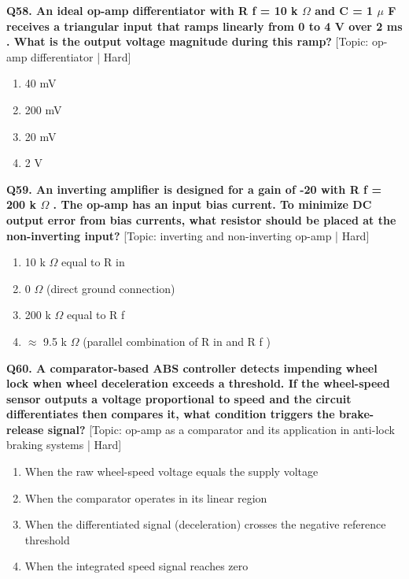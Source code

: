 \noindent\textbf{Q58. An ideal op-amp differentiator with R f = 10 k $\Omega$ and C = 1 $\mu$ F receives a triangular input that ramps linearly from 0 to 4 V over 2 ms . What is the output voltage magnitude during this ramp?} \hfill [Topic: op-amp differentiator | Hard]
\begin{enumerate}[label=(\alph*),topsep=2pt,itemsep=1pt,partopsep=0pt,parsep=0pt]
    \item {40 mV}
    \item {200 mV}
    \item {20 mV}
    \item {2 V}
\end{enumerate}
\vspace{2mm}

\noindent\textbf{Q59. An inverting amplifier is designed for a gain of -20 with R f = 200 k $\Omega$ . The op-amp has an input bias current. To minimize DC output error from bias currents, what resistor should be placed at the non-inverting input?} \hfill [Topic: inverting and non-inverting op-amp | Hard]
\begin{enumerate}[label=(\alph*),topsep=2pt,itemsep=1pt,partopsep=0pt,parsep=0pt]
    \item {10 k $\Omega$ equal to R in}
    \item {0 $\Omega$ (direct ground connection)}
    \item {200 k $\Omega$ equal to R f}
    \item {$\approx$ 9.5 k $\Omega$ (parallel combination of R in and R f )}
\end{enumerate}
\vspace{2mm}

\noindent\textbf{Q60. A comparator-based ABS controller detects impending wheel lock when wheel deceleration exceeds a threshold. If the wheel-speed sensor outputs a voltage proportional to speed and the circuit differentiates then compares it, what condition triggers the brake-release signal?} \hfill [Topic: op-amp as a comparator and its application in anti-lock braking systems | Hard]
\begin{enumerate}[label=(\alph*),topsep=2pt,itemsep=1pt,partopsep=0pt,parsep=0pt]
    \item {When the raw wheel-speed voltage equals the supply voltage}
    \item {When the comparator operates in its linear region}
    \item {When the differentiated signal (deceleration) crosses the negative reference threshold}
    \item {When the integrated speed signal reaches zero}
\end{enumerate}
\vspace{2mm}


